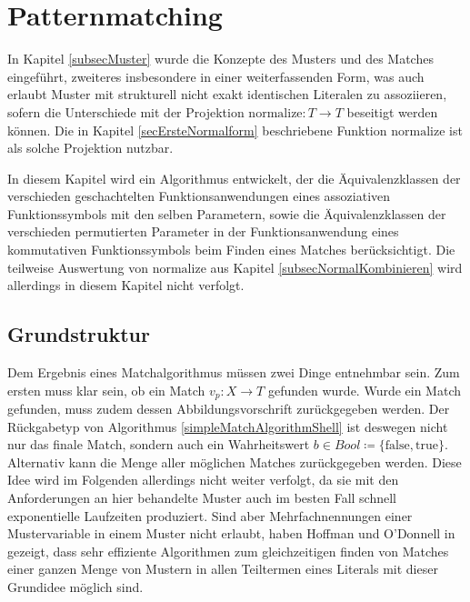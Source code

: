 

\section{Patternmatching} \label{secPattermatching}

In Kapitel \ref{subsecMuster} wurde die Konzepte des Musters und des Matches eingeführt, zweiteres insbesondere in einer weiterfassenden Form, was auch erlaubt Muster mit strukturell nicht exakt identischen Literalen zu assoziieren, sofern die Unterschiede mit der Projektion $\mathrm{normalize} \colon T \rightarrow T$ beseitigt werden können. Die in Kapitel \ref{secErsteNormalform} beschriebene Funktion $\mathrm{normalize}$ ist als solche Projektion nutzbar.  

In diesem Kapitel wird ein Algorithmus entwickelt, der die Äquivalenzklassen der verschieden geschachtelten Funktionsanwendungen eines assoziativen Funktionssymbols mit den selben Parametern, sowie die Äquivalenzklassen der verschieden permutierten Parameter in der Funktionsanwendung eines kommutativen Funktionssymbols beim Finden eines Matches berücksichtigt. Die teilweise Auswertung von $\mathrm{normalize}$ aus Kapitel \ref{subsecNormalKombinieren} wird allerdings in diesem Kapitel nicht verfolgt.


\subsection{Grundstruktur} \label{subsecPatternmatchingGrundstruktur}

Dem Ergebnis eines Matchalgorithmus müssen zwei Dinge entnehmbar sein. Zum ersten muss klar sein, ob ein Match $v_p \colon X \rightarrow T$ gefunden wurde. Wurde ein Match gefunden, muss zudem dessen Abbildungsvorschrift zurückgegeben werden. Der Rückgabetyp von Algorithmus \ref{simpleMatchAlgorithmShell} ist deswegen nicht nur das finale Match, sondern auch ein Wahrheitswert $b \in \mathit{Bool} \coloneqq \{\mathrm{false}, \mathrm{true}\}$. Alternativ kann die Menge aller möglichen Matches zurückgegeben werden. Diese Idee wird im Folgenden allerdings nicht weiter verfolgt, da sie mit den Anforderungen an hier behandelte Muster auch im besten Fall schnell exponentielle Laufzeiten produziert. Sind aber Mehrfachnennungen einer Mustervariable in einem Muster nicht erlaubt, haben Hoffman und O'Donnell in \cite{patternMatchingInTrees} gezeigt, dass sehr effiziente Algorithmen zum gleichzeitigen finden von Matches einer ganzen Menge von Mustern in allen Teiltermen eines Literals mit dieser Grundidee möglich sind.\\

